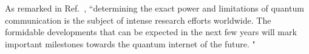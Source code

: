 As remarked in Ref.~\cite{diamanti2016practical},
``determining the exact power and limitations of quantum
communication is the subject of intense research efforts worldwide.
The formidable developments that can be expected in the
next few years will mark important milestones towards the
quantum internet of the future. "  


